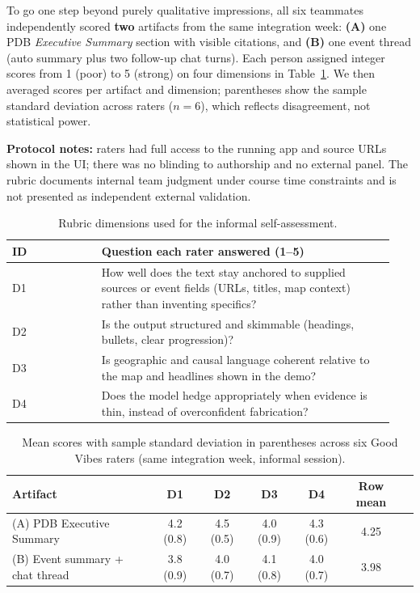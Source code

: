 To go one step beyond purely qualitative impressions, all six teammates independently scored \textbf{two} artifacts from the same integration week: \textbf{(A)} one PDB \emph{Executive Summary} section with visible citations, and \textbf{(B)} one event thread (auto summary plus two follow-up chat turns). Each person assigned integer scores from 1 (poor) to 5 (strong) on four dimensions in Table~\ref{tab:rubric}. We then averaged scores per artifact and dimension; parentheses show the sample standard deviation across raters ($n=6$), which reflects disagreement, not statistical power.

\textbf{Protocol notes:} raters had full access to the running app and source URLs shown in the UI; there was no blinding to authorship and no external panel. The rubric documents internal team judgment under course time constraints and is not presented as independent external validation.

\begin{table}[!htbp]
  \centering
  \caption{Rubric dimensions used for the informal self-assessment.}
  \label{tab:rubric}
  \begin{tabular}{@{}p{0.22\linewidth}p{0.72\linewidth}@{}}
    \toprule
    \textbf{ID} & \textbf{Question each rater answered (1--5)} \\
    \midrule
    D1 & How well does the text stay anchored to supplied sources or event fields (URLs, titles, map context) rather than inventing specifics? \\
    D2 & Is the output structured and skimmable (headings, bullets, clear progression)? \\
    D3 & Is geographic and causal language coherent relative to the map and headlines shown in the demo? \\
    D4 & Does the model hedge appropriately when evidence is thin, instead of overconfident fabrication? \\
    \bottomrule
  \end{tabular}
\end{table}
\FloatBarrier

\begin{table}[!htbp]
  \centering
  \caption{Mean scores with sample standard deviation in parentheses across six Good Vibes raters (same integration week, informal session).}
  \label{tab:rubric-scores}
  \begin{tabular}{@{}lcccccc@{}}
    \toprule
    \textbf{Artifact} & \textbf{D1} & \textbf{D2} & \textbf{D3} & \textbf{D4} & \textbf{Row mean} \\
    \midrule
    (A) PDB Executive Summary & 4.2 (0.8) & 4.5 (0.5) & 4.0 (0.9) & 4.3 (0.6) & 4.25 \\
    (B) Event summary + chat thread & 3.8 (0.9) & 4.0 (0.7) & 4.1 (0.8) & 4.0 (0.7) & 3.98 \\
    \bottomrule
  \end{tabular}
\end{table}
\FloatBarrier

